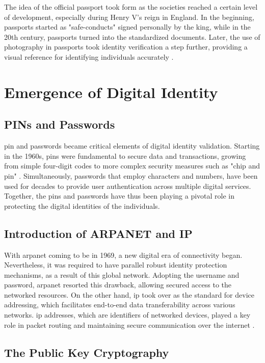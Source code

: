 The idea of the official passport took form as the societies reached a certain level of development,  especially during Henry V's reign in England. In the beginning, 
passports started as "safe-conducts" signed personally by the king, while in the 20th century, passports turned into the standardized documents. Later, the use of 
photography in passports took identity verification a step further, providing a visual reference for identifying individuals accurately \cite{businessreporter}.

\section{Emergence of Digital Identity}

\subsection{PINs and Passwords}

\gls{pin} and passwords became critical elements of digital identity validation. Starting in the 1960s, \gls{pin}s were fundamental to secure data and transactions, growing 
from simple four-digit codes to more complex security measures such as "chip and pin" \cite{mediumdigitalidentity}. Simultaneously, passwords that employ characters and 
numbers, have been used for decades to provide user authentication across multiple digital services. Together, the \gls{pin}s and passwords have thus been playing a pivotal 
role in protecting the digital identities of the individuals.

\subsection{Introduction of ARPANET and IP}

With \gls{arpanet} coming to be in 1969, a new digital era of connectivity began. Nevertheless, it was required to have parallel robust identity protection mechanisms, as a 
result of this global network. Adopting the username and password, \gls{arpanet} resorted this drawback, allowing secured access to the networked resources. On the other hand, 
\gls{ip} took over as the standard for device addressing, which facilitates end-to-end data transferability across various networks. \gls{ip} addresses, which are 
identifiers of networked devices, played a key role in packet routing and maintaining secure communication over the internet \cite{mediumdigitalidentity}.

\subsection{The Public Key Cryptography}

